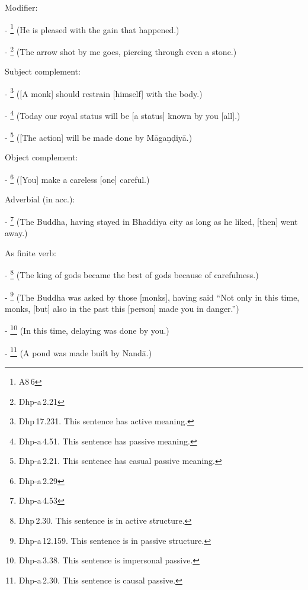\begin{compactenum}[(1)]
\item Modifier:\par
- \footnote{A8\,6} (He is pleased with the gain that happened.)\par
- \footnote{Dhp-a\,2.21} (The arrow shot by me goes, piercing through even a stone.)\par

\item Subject complement:\par
- \footnote{Dhp\,17.231. This sentence has active meaning.} ([A monk] should restrain [himself] with the body.)\par
- \footnote{Dhp-a\,4.51. This sentence has passive meaning.} (Today our royal status will be [a status] known by you [all].)\par
- \footnote{Dhp-a\,2.21. This sentence has casual passive meaning.} ([The action] will be made done by M\=aga\d n\d diy\=a.)\par

\item Object complement:\par
- \footnote{Dhp-a\,2.29} ([You] make a careless [one] careful.)\par

\item Adverbial (in acc.):\par
- \footnote{Dhp-a\,4.53} (The Buddha, having stayed in Bhaddiya city as long as he liked, [then] went away.)\par

\item As finite verb:\par
- \footnote{Dhp\,2.30. This sentence is in active structure.} (The king of gods became the best of gods because of carefulness.)\par
- \footnote{Dhp-a\,12.159. This sentence is in passive structure.} (The Buddha was asked by those [monks], having said ``Not only in this time, monks, [but] also in the past this [person] made you in danger.'')\par
- \footnote{Dhp-a\,3.38. This sentence is impersonal passive.} (In this time, delaying was done by you.)\par
- \footnote{Dhp-a\,2.30. This sentence is causal passive.} (A pond was made built by Nand\=a.)\par


\end{compactenum}
